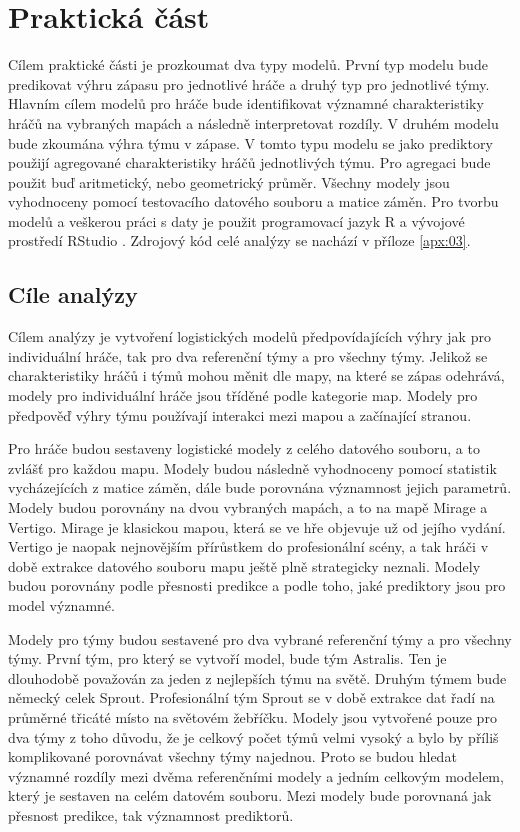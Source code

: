 \chapter{Praktická část}
Cílem praktické části je prozkoumat dva typy modelů. První typ modelu bude predikovat výhru zápasu pro jednotlivé hráče a druhý typ pro jednotlivé týmy. Hlavním cílem 
modelů pro hráče bude identifikovat významné charakteristiky hráčů na vybraných mapách a následně interpretovat rozdíly. V druhém modelu bude zkoumána výhra týmu v zápase.
V tomto typu modelu se jako prediktory použijí agregované charakteristiky hráčů jednotlivých týmu. Pro agregaci bude použit buď aritmetický, nebo geometrický průměr. Všechny
modely jsou vyhodnoceny pomocí testovacího datového souboru a matice záměn. Pro tvorbu modelů a veškerou práci s daty je použit programovací jazyk R \cite{team_r_2022}
a vývojové prostředí RStudio \cite{rstudio_rstudio_2022}. Zdrojový kód celé analýzy se nachází v příloze \ref{apx:03}.

\section{Cíle analýzy}
Cílem analýzy je vytvoření logistických modelů předpovídajících výhry jak pro individuální hráče, tak pro dva referenční týmy a pro  všechny týmy. Jelikož se charakteristiky hráčů i 
týmů mohou měnit dle mapy, na které se zápas odehrává, modely pro individuální hráče jsou tříděné podle kategorie map. Modely pro předpověď výhry týmu používají interakci
mezi mapou a začínající
stranou.

Pro hráče budou sestaveny logistické modely z celého datového souboru, a to zvlášť pro každou mapu. Modely budou následně vyhodnoceny pomocí statistik vycházejících
z matice záměn, dále bude porovnána významnost jejich parametrů. Modely budou porovnány na dvou vybraných mapách, a to na mapě Mirage a Vertigo. Mirage je klasickou mapou, která
se ve hře objevuje už od jejího vydání. Vertigo je naopak nejnovějším přírůstkem do profesionální scény, a tak hráči v době extrakce datového souboru mapu ještě plně strategicky 
neznali. Modely budou porovnány podle přesnosti predikce a podle toho, jaké prediktory jsou pro model významné.

Modely pro týmy budou sestavené pro dva vybrané referenční týmy a pro všechny týmy. První tým, pro který se vytvoří model, bude tým Astralis.
Ten je dlouhodobě považován za jeden z nejlepších týmu na světě. Druhým týmem bude německý celek Sprout. Profesionální tým Sprout se v době extrakce dat řadí na průměrné
třicáté místo na světovém žebříčku. Modely jsou vytvořené pouze pro dva týmy z toho důvodu, že je celkový počet týmů velmi vysoký a bylo by příliš komplikované porovnávat
všechny týmy najednou. Proto se budou hledat významné rozdíly mezi dvěma referenčními modely a jedním celkovým modelem, který je sestaven na celém datovém souboru. Mezi modely
bude porovnaná jak přesnost predikce, tak významnost prediktorů. 

